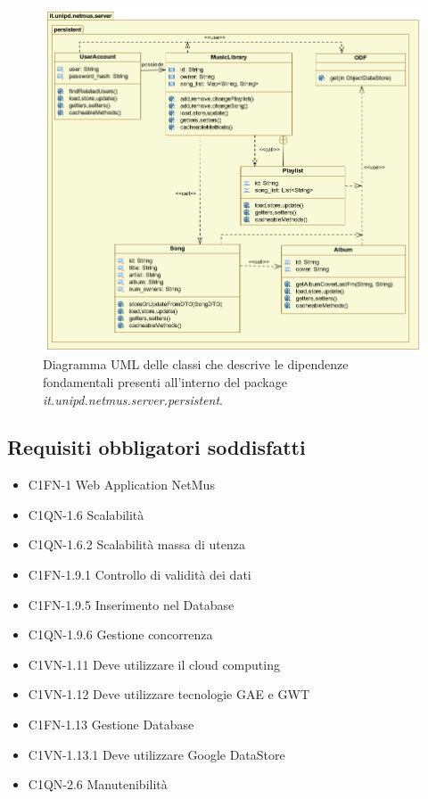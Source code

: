 \begin{figure}[!h]
  \centering
  \includegraphics[width=17cm]{img/DP/classes_server_persistent.png}
\caption{Diagramma UML delle classi che descrive le dipendenze
fondamentali presenti all'interno del package
\emph{it.unipd.netmus.server.persistent}.}
\end{figure}


\subsection*{Requisiti obbligatori soddisfatti}
\begin{itemize}
    \item C1FN-1 Web Application NetMus
    \item C1QN-1.6 Scalabilit\`a
    \item C1QN-1.6.2 Scalabilit\`a massa di utenza
    \item C1FN-1.9.1 Controllo di validit\`a dei dati
	\item C1FN-1.9.5 Inserimento nel Database
	\item C1QN-1.9.6 Gestione concorrenza
	\item C1VN-1.11 Deve utilizzare il cloud computing
	\item C1VN-1.12 Deve utilizzare tecnologie GAE e GWT
	\item C1FN-1.13 Gestione Database
	\item C1VN-1.13.1 Deve utilizzare Google DataStore
	\item C1QN-2.6 Manutenibilit\`a
\end{itemize}
